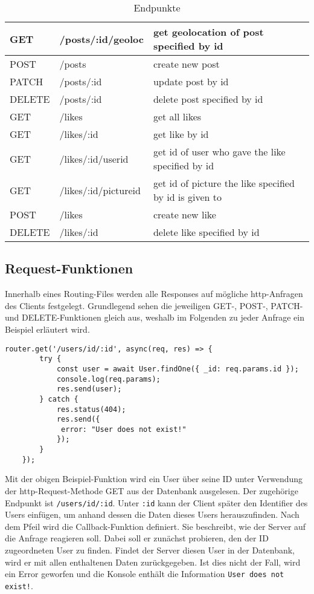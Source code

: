 \begin{table}[!htb]
\begin{tabularx}{\textwidth}{|x|X|X|}
    \hline
    GET & /posts/:id/geoloc & get geolocation of post specified by id\\
    \hline
    POST & /posts & create new post\\
    \hline
    PATCH & /posts/:id & update post by id\\
    \hline
    DELETE & /posts/:id & delete post specified by id\\
    \hline
    \hline
    GET & /likes & get all likes\\
    \hline
    GET & /likes/:id & get like by id\\
    \hline
    GET & /likes/:id/userid & get id of user who gave the like specified by id \\
    \hline
    GET & /likes/:id/pictureid & get id of picture the like specified by id is given to\\
    \hline
    POST & /likes & create new like\\
    \hline
    DELETE & /likes/:id & delete like specified by id\\
    \hline
\end{tabularx}
\caption{Endpunkte}
\label{endpunkte}
\end{table}

\subsection{Request-Funktionen}
Innerhalb eines Routing-Files werden alle Responses auf mögliche http-Anfragen des Clients festgelegt. Grundlegend sehen die jeweiligen GET-, POST-, PATCH- und DELETE-Funktionen gleich aus, weshalb im Folgenden zu jeder Anfrage ein Beispiel erläutert wird.

\begin{lstlisting}[caption=GET-Request, label=lst:getrequest]
    router.get('/users/id/:id', async(req, res) => {
        try {
            const user = await User.findOne({ _id: req.params.id });
            console.log(req.params);
            res.send(user);
        } catch {
            res.status(404);
            res.send({
             error: "User does not exist!"
            });
        }
    });
\end{lstlisting}

Mit der obigen Beispiel-Funktion wird ein User über seine ID unter Verwendung der http-Request-Methode GET aus der Datenbank ausgelesen. Der zugehörige Endpunkt ist \texttt{/users/id/:id}. Unter \texttt{:id} kann der Client später den Identifier des Users einfügen, um anhand dessen die Daten dieses Users herauszufinden. Nach dem Pfeil wird die Callback-Funktion definiert. Sie beschreibt, wie der Server auf die Anfrage reagieren soll. Dabei soll er zunächst probieren, den der ID zugeordneten User zu finden. Findet der Server diesen User in der Datenbank, wird er mit allen enthaltenen Daten zurückgegeben. Ist dies nicht der Fall, wird ein Error geworfen und die Konsole enthält die Information \texttt{User does not exist!}.

